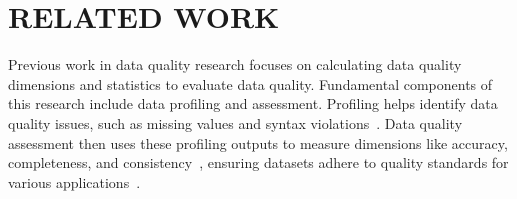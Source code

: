 \section{RELATED WORK}
\label{sec:relatedwork}
Previous work in data quality research focuses on calculating data quality dimensions and statistics to evaluate data quality. Fundamental components of this research include data profiling and assessment.
Profiling helps identify data quality issues, such as missing values and syntax violations~\cite{chiang2008discovering, ilyas2015trends, razniewski2011completeness}. Data quality assessment then uses these profiling outputs to measure dimensions like accuracy, completeness, and consistency~\cite{DBLP:journals/jmis/WangS96, sidi2012data}, ensuring datasets adhere to quality standards for various applications~\cite{jayawardene2013curse, jayawardene2015analysis, YEGANEH201424}.


